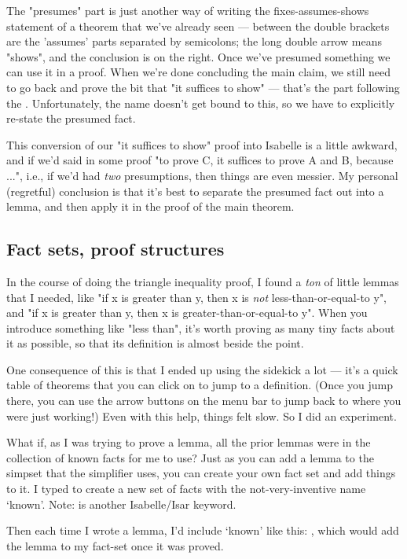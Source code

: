 The "presumes" part is just another way of writing the fixes-assumes-shows statement of a theorem that we've already seen --- between the double brackets are the 'assumes' parts separated by semicolons; the long double arrow means "shows", and the conclusion is on the right. Once we've presumed something
we can use it in a proof. When we're done concluding the main claim, we still need to go back and prove the bit that "it suffices to show" --- that's the part following the . Unfortunately, the name  doesn't get bound to this, so we have to explicitly re-state the presumed fact. 

This conversion of our "it suffices to show" proof into Isabelle is a little awkward, and if we'd said in some proof "to prove C, it suffices to prove A and B, because ...", i.e., if we'd had \textit{two} presumptions, then things are even messier. My personal (regretful) conclusion is that it's best to separate the presumed fact out into a lemma, and then apply it in the proof of the main theorem. 

\subsection{Fact sets, proof structures}
In the course of doing the triangle inequality proof, I found a \textit{ton} of little lemmas that I needed, like "if x is greater than y, then x is \textit{not} less-than-or-equal-to y", and "if x is greater than y, then x is greater-than-or-equal-to y". When you introduce something like "less than", it's worth proving as many tiny facts about it as possible, so that its definition is almost beside the point. 

One consequence of this is that I ended up using the sidekick a lot --- it's a quick table of theorems that you can click on to jump to a definition. (Once you jump there, you can use the arrow buttons on the menu bar to jump back to where you were just working!) Even with this help, things felt slow. So I did an experiment. 

What if, as I was trying to prove a lemma, all the prior lemmas were in the collection of known facts for me to use? Just as you can add a lemma to the simpset that the simplifier uses, you can create your own fact set and add things to it. I typed  to create a new set of facts with the not-very-inventive name `known'. Note:  is another Isabelle/Isar keyword. 

Then each time I wrote a lemma, I'd include `known' like this: , which would add the lemma  to my fact-set once it was proved. 

